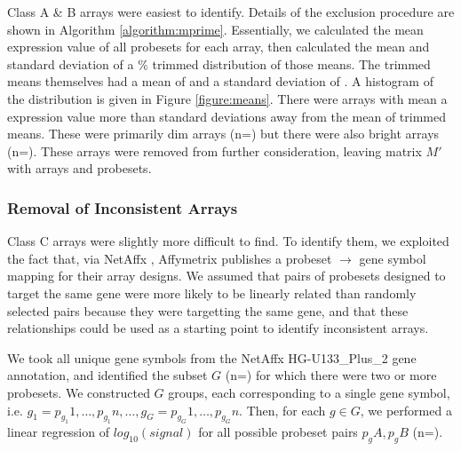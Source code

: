 \documentclass{bioinfo}
\begin{document}
\begin{methods}
Class A \& B arrays were easiest to identify.  Details of the exclusion
procedure are shown in Algorithm \ref{algorithm:mprime}.  Essentially, we
calculated the mean expression value of all probesets for each array, then
calculated the mean and standard deviation of a \% trimmed
distribution of those means.  The trimmed means themselves had a mean of
 and a standard deviation of
.  A histogram of the distribution is given in Figure
\ref{figure:means}.  There were  arrays with mean a
expression value more than  standard deviations away
from the mean of trimmed means.  These were primarily dim arrays
(n=) but there were also bright arrays
(n=).  These arrays were removed from further
consideration, leaving matrix $M\prime$ with  arrays and
 probesets.

\subsubsection{Removal of Inconsistent Arrays}\label{inconsistent}

Class C arrays were slightly more difficult to find.  To identify them, we
exploited the fact that, via NetAffx \cite{netaffx}, Affymetrix publishes a
probeset $\rightarrow$ gene symbol mapping for their array designs.  We assumed
that pairs of probesets designed to target the same gene were more likely to be
linearly related than randomly selected pairs because they were targetting the
same gene, and that these relationships could be used as a starting point to
identify inconsistent arrays.

We took all  unique gene symbols from the NetAffx
HG-U133\_Plus\_2 gene annotation, and identified the subset $G$
(n=) for which there were two or more probesets.  We
constructed $G$ groups, each corresponding to a single gene symbol, i.e.
$g_1={p_{g_1}1,\dots,p_{g_1}n},\dots,g_G={p_{g_G}1,\dots,p_{g_G}n}$.  Then, for
each $g{\in}G$, we performed a linear regression of $log_{10}(signal)$ for all
possible probeset pairs $p_gA,p_gB$ (n=).


\end{methods}
\end{document}
